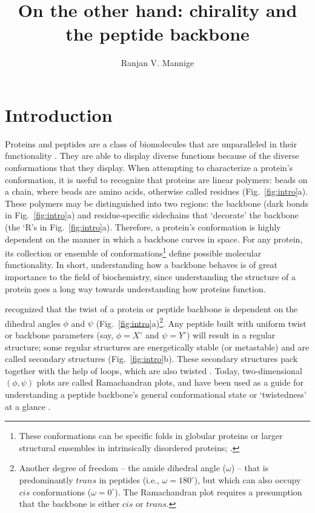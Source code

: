 \documentclass[fleqn,10pt]{wlpeerj} %
\title{On the other hand: chirality and the peptide backbone}
\author[1,*]{Ranjan V. Mannige}
\affil[1]{~Molecular Foundry, Lawrence Berkeley National Laboratory, Berkeley, CA, U.S.A.}
\affil[*]{~rvmannige@lbl.gov}
\newcommand{\Fig}[1]{Fig.~\ref{#1}}
\begin{document}
\flushbottom
\maketitle
\thispagestyle{empty}

\section*{Introduction}

Proteins and peptides are a class of biomolecules that are unparalleled in their functionality \citep{Berg2006}. 
They are able to display diverse functions because of the diverse conformations that they display. 
When attempting to characterize a protein's conformation, it is useful to recognize that proteins are linear polymers:  beads on a chain, where beads are amino acids, otherwise called residues (\Fig{fig:intro}a). These polymers may be distinguished into two regions: the backbone (dark bonds in \Fig{fig:intro}a) and residue-specific sidechains that `decorate' the backbone (the `R's in \Fig{fig:intro}a). Therefore, a protein's conformation is highly dependent on the manner in which a backbone curves in space. For any protein, its collection or ensemble of conformations\footnote{These conformations can be specific folds in globular proteins or larger structural ensembles in intrinsically disordered proteins; \cite{Mannige2014b}.} define possible molecular functionality. 
In short, understanding how a backbone behaves is of great importance to the field of biochemistry, since understanding the structure of a protein goes a long way towards understanding how proteins function. 

\cite{Ramachandran1963} recognized that the twist of a protein or peptide backbone is dependent on the dihedral angles $\phi$ and $\psi$ (\Fig{fig:intro}a)\footnote{Another degree of freedom -- the amide dihedral angle ($\omega$) -- that is predominantly $trans$ in peptides (i.e., $\omega = 180^\circ$), but which can also occupy $cis$ conformations ($\omega = 0^\circ$). The Ramachandran plot requires a presumption that the backbone is either $cis$ or $trans$.}. 
Any peptide built with uniform twist or backbone parameters (say, $\phi=X^\circ$ and $\psi=Y^\circ$) will result in a regular structure; some regular structures are energetically stable (or metastable) and are called secondary structures (\Fig{fig:intro}b). These secondary structures pack together with the help of loops, which are also twisted \citep{Berg2006}. Today, two-dimensional $(\phi,\psi)$ plots are called Ramachandran plots, and have been used as a guide for understanding a peptide backbone's general conformational state or `twistedness' at a glance \citep{Ho2003,Berg2006,Alberts2002,Subramanian2001,Laskowski1993,Hooft1997,Laskowski2003}.
\end{document}
